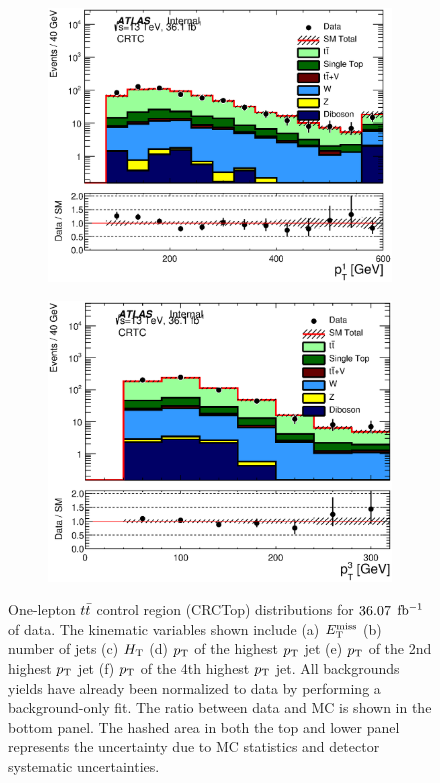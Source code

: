 \begin{figure}[h!]
\begin{center}
\begin{subfigure}[b]{0.40\textwidth}
    	 \includegraphics[width=\textwidth]{figures/plotRegion/JetPt_1__CRTopC_log.eps}
                \caption{ }
    \end{subfigure}
    \begin{subfigure}[b]{0.40\textwidth}    
    	 \includegraphics[width=\textwidth]{figures/plotRegion/JetPt_3__CRTopC_log.eps}
               \caption{ }
    \end{subfigure}
     \caption[One-lepton $\ttbar$ control region (CRCTop) distributions for $\intlumi$ $\ifb$ of data]{ 
     One-lepton $\ttbar$ control region (CRCTop) distributions for $\intlumi$ $\ifb$ of data. The kinematic variables shown include (a) $E_{\mathrm{T}}^{\mathrm{miss}}$ (b) number of jets (c) $H_{\mathrm{T}}$ (d) $p_{\mathrm{T}}$ of the highest $p_{\mathrm{T}}$ jet (e) $p_{\mathrm{T}}$ of the 2nd highest $p_{\mathrm{T}}$ jet (f) $p_{\mathrm{T}}$ of the 4th highest $p_{\mathrm{T}}$ jet.  All backgrounds yields have already been normalized to data by performing a background-only fit.  The ratio between data and MC is shown in the bottom panel. The hashed area in both the top and lower panel represents the uncertainty due to MC statistics and detector systematic uncertainties. }
  \label{fig:CRTopC1}
    \end{center}
\end{figure}

